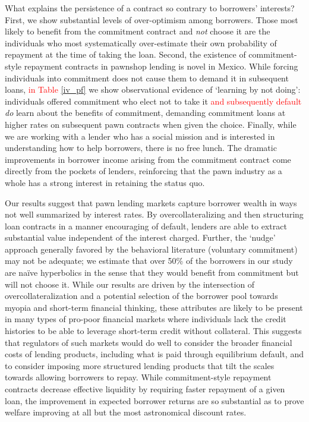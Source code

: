 \documentclass[oneside,11pt]{article}
\begin{document}
What explains the persistence of a contract so contrary to borrowers’ interests?  First, we show substantial levels of over-optimism among borrowers.  Those most likely to benefit from the commitment contract and \textit{not} choose it are the individuals who most systematically over-estimate their own probability of repayment at the time of taking the loan.  Second, the existence of commitment-style repayment contracts in pawnshop lending is novel in Mexico.  While forcing individuals into commitment does not cause them to demand it in subsequent loans, \textcolor{red}{in Table \ref{iv_pf}} we show observational evidence of `learning by not doing’:  individuals offered commitment who elect not to take it \textcolor{red}{and subsequently default} \textit{do} learn about the benefits of commitment, demanding commitment loans at higher rates on subsequent pawn contracts when given the choice.  Finally, while we are working with a lender who has a social mission and is interested in understanding how to help borrowers, there is no free lunch.  The dramatic improvements in borrower income arising from the commitment contract come directly from the pockets of lenders, reinforcing that the pawn industry as a whole has a strong interest in retaining the status quo.

Our results suggest that pawn lending markets capture borrower wealth in ways not well summarized by interest rates.  By overcollateralizing and then structuring loan contracts in a manner encouraging of default, lenders are able to extract substantial value independent of the interest charged.  Further, the `nudge’ approach generally favored by the behavioral literature (voluntary commitment) may not be adequate; we estimate that over 50\% of the borrowers in our study are naïve hyperbolics in the sense that they would benefit from commitment but will not choose it.  While our results are driven by the intersection of overcollateralization and a potential selection of the borrower pool towards myopia and short-term financial thinking, these attributes are likely to be present in many types of pro-poor financial markets where individuals lack the credit histories to be able to leverage short-term credit without collateral.  This suggests that regulators of such markets would do well to consider the broader financial costs of lending products, including what is paid through equilibrium default, and to consider imposing more structured lending products that tilt the scales towards allowing borrowers to repay.  While commitment-style repayment contracts decrease effective liquidity by requiring faster repayment of a given loan, the improvement in expected borrower returns are so substantial as to prove welfare improving at all but the most astronomical discount rates.  
\end{document}
